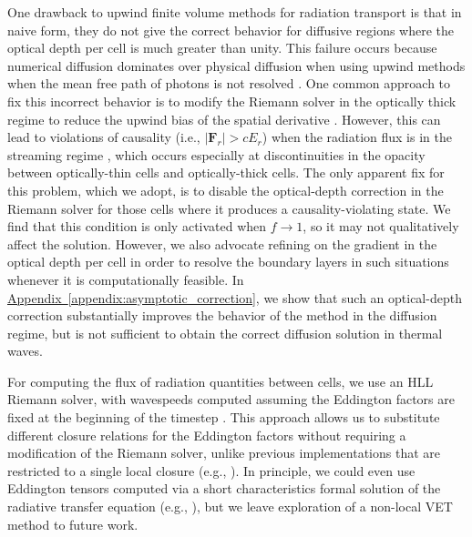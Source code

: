 \documentclass[fleqn,usenatbib]{mnras}
\newcommand{\aref}[1]{\hyperref[#1]{Appendix~\ref{#1}}}
\begin{document}
One drawback to upwind finite volume methods for radiation transport is that in naive form, they do not give the correct behavior for diffusive regions where the optical depth per cell is much greater than unity. This failure occurs because numerical diffusion dominates over physical diffusion when using upwind methods when the mean free path of photons is not resolved \citep{Lowrie_2001}. One common approach to fix this incorrect behavior is to modify the Riemann solver in the optically thick regime to reduce the upwind bias of the spatial derivative \citep{Audit_2002,Skinner_2019,Mezzacappa_2020}. However, this can lead to violations of causality (i.e., $|\mathbf{F}_r| > cE_r$) when the radiation flux is in the streaming regime \citep{Audit_2002}, which occurs especially at discontinuities in the opacity between optically-thin cells and optically-thick cells. The only apparent fix for this problem, which we adopt, is to disable the optical-depth correction in the Riemann solver for those cells where it produces a causality-violating state. We find that this condition is only activated when $f \rightarrow 1$, so it may not qualitatively affect the solution. However, we also advocate refining on the gradient in the optical depth per cell in order to resolve the boundary layers in such situations whenever it is computationally feasible. In \aref{appendix:asymptotic_correction}, we show that such an optical-depth correction substantially improves the behavior of the method in the diffusion regime, but is not sufficient to obtain the correct diffusion solution in thermal waves.

For computing the flux of radiation quantities between cells, we use an HLL Riemann solver, with wavespeeds computed assuming the Eddington factors are fixed at the beginning of the timestep \citep{Balsara_1999}. This approach allows us to substitute different closure relations for the Eddington factors without requiring a modification of the Riemann solver, unlike previous implementations that are restricted to a single local closure (e.g., \citealt{Gonzalez_2007,Skinner_2013,Skinner_2019}). In principle, we could even use Eddington tensors computed via a short characteristics formal solution of the radiative transfer equation (e.g., \citealt{Davis_2012}), but we leave exploration of a non-local VET method to future work.
\end{document}
